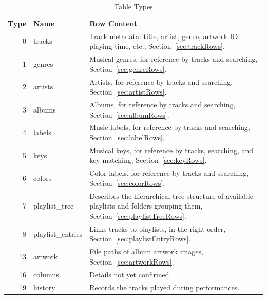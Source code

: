 \documentclass[11pt]{article}
\begin{document}
\begin{longtabu}{rlX}
  \toprule
  {\bfseries Type} & {\bfseries Name} & {\bfseries Row Content} \endhead

  \bottomrule \\
  \caption{Table Types} \endfoot

  0 & tracks & Track metadata: title, artist, genre, artwork ID,
  playing time, etc.,
  Section~\ref{sec:trackRows}. \label{table:tableTypes} \\

  1 & genres & Musical genres, for reference by tracks and searching,
  Section~\ref{sec:genreRows}. \\

  2 & artists & Artists, for reference by tracks and searching,
  Section~\ref{sec:artistRows}. \\

  3 & albums & Albums, for reference by tracks and searching,
  Section~\ref{sec:albumRows}. \\

  4 & labels & Music labels, for reference by tracks and searching,
  Section~\ref{sec:labelRows}. \\

  5 & keys & Musical keys, for reference by tracks, searching, and key
  matching, Section~\ref{sec:keyRows}. \\

  6 & colors & Color labels, for reference by tracks and searching,
  Section~\ref{sec:colorRows}. \\

  7 & playlist\_tree & Describes the hierarchical tree structure of
  available playlists and folders grouping them,
  Section~\ref{sec:playlistTreeRows}. \\

  8 & playlist\_entries & Links tracks to playlists, in the right
  order, Section~\ref{sec:playlistEntryRows}. \\

  13 & artwork & File paths of album artwork images,
  Section~\ref{sec:artworkRows}. \\

  16 & columns & Details not yet confirmed. \\

  19 & history & Records the tracks played during performances. \\

\end{longtabu}
\end{document}

